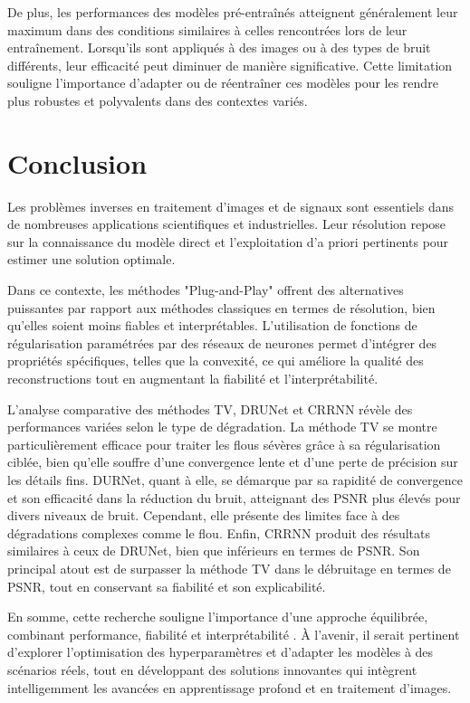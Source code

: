 \documentclass[a4paper, 12pt]{report} %
\begin{document}
De plus, les performances des modèles pré-entraînés atteignent généralement leur maximum dans des conditions similaires à celles rencontrées lors de leur entraînement. Lorsqu'ils sont appliqués à des images ou à des types de bruit différents, leur efficacité peut diminuer de manière significative. Cette limitation souligne l'importance d'adapter ou de réentraîner ces modèles pour les rendre plus robustes et polyvalents dans des contextes variés.

\chapter*{Conclusion}

Les problèmes inverses en traitement d’images et de signaux sont essentiels dans de nombreuses applications scientifiques et industrielles. Leur résolution repose sur la connaissance du modèle direct et l’exploitation d’a priori pertinents pour estimer une solution optimale.

Dans ce contexte, les méthodes "Plug-and-Play" offrent des alternatives puissantes par rapport aux méthodes classiques en termes de résolution, bien qu'elles soient moins fiables et interprétables. L'utilisation de fonctions de régularisation paramétrées par des réseaux de neurones permet d'intégrer des propriétés spécifiques, telles que la convexité, ce qui améliore la qualité des reconstructions tout en augmentant la fiabilité et l'interprétabilité.

L'analyse comparative des méthodes TV, DRUNet et CRRNN révèle des performances variées selon le type de dégradation. La méthode TV se montre particulièrement efficace pour traiter les flous sévères grâce à sa régularisation ciblée, bien qu'elle souffre d'une convergence lente et d'une perte de précision sur les détails fins. DURNet, quant à elle, se démarque par sa rapidité de convergence et son efficacité dans la réduction du bruit, atteignant des PSNR plus élevés pour divers niveaux de bruit. Cependant, elle présente des limites face à des dégradations complexes comme le flou. Enfin, CRRNN produit des résultats similaires à ceux de DRUNet, bien que inférieurs en termes de PSNR. Son principal atout est de surpasser la méthode TV dans le débruitage en termes de PSNR, tout en conservant sa fiabilité et son explicabilité.

En somme, cette recherche souligne l'importance d'une approche équilibrée, combinant performance, fiabilité et interprétabilité . À l'avenir, il serait pertinent d'explorer l'optimisation des hyperparamètres et d'adapter les modèles à des scénarios réels, tout en développant des solutions innovantes qui intègrent intelligemment les avancées en apprentissage profond et en traitement d'images. 
\end{document}
